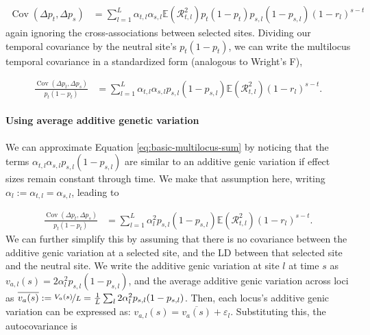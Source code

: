 \documentclass[11pt]{article}
\newcommand{\E}{\mathbb{E}}
\DeclareMathOperator{\cov}{Cov}
\begin{document}
\begin{align}
  \cov(\Delta p_t, \Delta p_s) &= \sum_{l=1}^L \alpha_{t,l} \alpha_{s,l}
  \E(\mathcal{R}_{t,l}^2) p_{t} (1-p_{t}) p_{s,l} (1-p_{s,l}) (1-r_{l})^{s-t} 
\end{align}
%
again ignoring the  cross-associations between selected sites.  Dividing our
temporal covariance by the neutral site's $p_t(1-p_t)$, we can write the
multilocus temporal covariance in a standardized form (analogous to Wright's
F),

\begin{align}
  \frac{\cov(\Delta p_t, \Delta p_s)}{p_t(1-p_t) } &=
  \sum_{l=1}^L \alpha_{t,l} \alpha_{s,l} p_{s,l} (1-p_{s,l}) \E(\mathcal{R}_{t,l}^2) (1-r_l)^{s-t}.
  \label{eq:basic-multilocus-sum}
\end{align}

\paragraph{Using average additive genetic variation}
\label{ap:ml-ave-Va}

We can approximate Equation \eqref{eq:basic-multilocus-sum} by noticing that
the terms $\alpha_{t,l} \alpha_{s,l} p_{s,l} (1-p_{s,l})$ are similar to an
additive genic variation if effect sizes remain constant through time. We make
that assumption here, writing $\alpha_l := \alpha_{t,l} = \alpha_{s,l}$, leading to

\begin{align}
  \frac{\cov(\Delta p_t, \Delta p_s)}{p_t(1-p_t) } &=
  \sum_{l=1}^L \alpha_{l}^2 p_{s,l} (1-p_{s,l}) \E(\mathcal{R}_{t,l}^2) (1-r_l)^{s-t}.
  \label{eq:basic-multilocus-sum-2}
\end{align}
%
We can further simplify this by assuming that there is no covariance between
the additive genic variation at a selected site, and the LD between that
selected site and the neutral site. We write the additive genic variation at
site $l$ at time $s$ as $v_{a,l}(s) = 2 \alpha_l^2 p_{s,l}(1-p_{s,l})$, and the
average additive genic variation across loci as $\overline{v_{a}(s)} := \nicefrac{V_a(s)}{L} =
\frac{1}{L} \sum_l 2 \alpha_l^2 p_{s,l}(1-p_{s,l})$. Then, each locus's
additive genic variation can be expressed as: $v_{a,l}(s) = \overline{v_a(s)} +
\varepsilon_l$. Substituting this, the autocovariance is 
\end{document}
